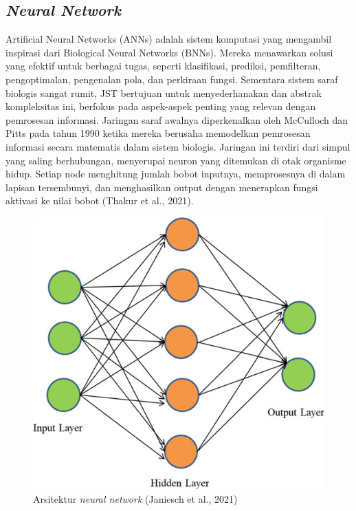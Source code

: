 \subsection{\emph{Neural Network}}
\label{subsec:cnn}

Artificial Neural Networks (ANNs) adalah sistem komputasi yang mengambil inspirasi dari Biological Neural Networks (BNNs). Mereka menawarkan solusi yang efektif untuk berbagai tugas, seperti klasifikasi, prediksi, pemfilteran, pengoptimalan, pengenalan pola, dan perkiraan fungsi. Sementara sistem saraf biologis sangat rumit, JST bertujuan untuk menyederhanakan dan abstrak kompleksitas ini, berfokus pada aspek-aspek penting yang relevan dengan pemrosesan informasi. Jaringan saraf awalnya diperkenalkan oleh McCulloch dan Pitts pada tahun 1990 ketika mereka berusaha memodelkan pemrosesan informasi secara matematis dalam sistem biologis. Jaringan ini terdiri dari simpul yang saling berhubungan, menyerupai neuron yang ditemukan di otak organisme hidup. Setiap node menghitung jumlah bobot inputnya, memprosesnya di dalam lapisan tersembunyi, dan menghasilkan output dengan menerapkan fungsi aktivasi ke nilai bobot (Thakur et al., 2021).

\begin{figure}[H]
  \centering
  \includegraphics[scale=1]{gambar/arsitekturann.png}
  \caption{Arsitektur \emph{neural network} (Janiesch et al., 2021)}
  \label{fig:arsiann}
\end{figure}

